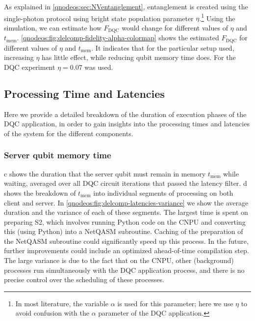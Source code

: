 As explained in \cref{qnodeos:sec:NVentanglement}, entanglement is created using the single-photon protocol using bright state population parameter $\eta$.\footnote{In most literature, the variable $\alpha$ is used for this parameter; here we use $\eta$ to avoid confusion with the $\alpha$ parameter of the \ac{DQC} application.} Using the simulation, we can estimate how $F_{\text{DQC}}$ would change for different values of $\eta$ and $t_{\text{mem}}$. \cref{qnodeos:fig:delcomp-fidelity-alpha-colormap} shows the estimated $F_{\text{DQC}}$ for different values of $\eta$ and $t_{\text{mem}}$. It indicates that for the particular setup used, increasing $\eta$ has little effect, while reducing qubit memory time does. For the \ac{DQC} experiment $\eta = 0.07$ was used.

\subsection{Processing Time and Latencies}
\label{qnodeos:sec:processing_time_latencies}

Here we provide a detailed breakdown of the duration of execution phases of the \ac{DQC} application, in order to gain insights into the processing times and latencies of the system for the different components.

\subsubsection{Server qubit memory time}
\label{qnodeos:sec:server-qubit-memory-time}

c shows the duration that the server qubit must remain in memory $t_{\text{mem}}$ while waiting, averaged over all \ac{DQC} circuit iterations that passed the latency filter. d shows the breakdown of $t_{\text{mem}}$ into individual segments of processing on both client and server. In \cref{qnodeos:fig:delcomp-latencies-variance} we show the average duration and the variance of each of these segments. The largest time is spent on preparing S2, which involves running Python code on the \ac{CNPU} and converting this (using Python) into a \ac{NetQASM} subroutine. Caching of the preparation of the \ac{NetQASM} subroutine could significantly speed up this process. In the future, further improvements could include an optimized ahead-of-time compilation step. The large variance is due to the fact that on the \ac{CNPU}, other (background) processes run simultaneously with the \ac{DQC} application process, and there is no precise control over the scheduling of these processes.

